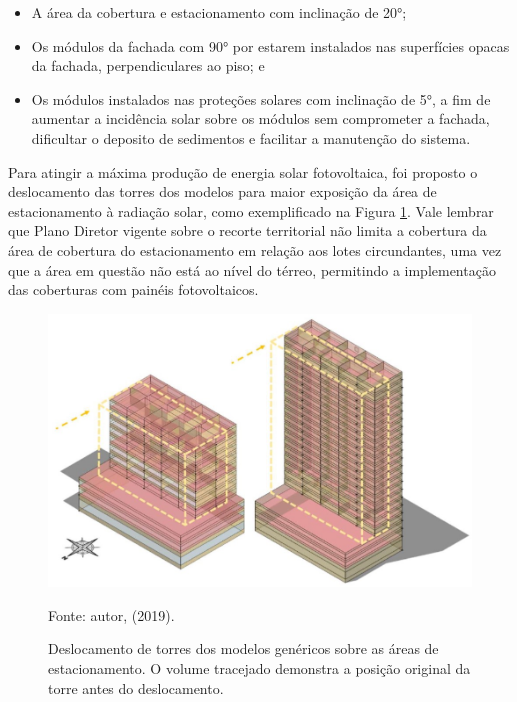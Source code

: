     \begin{itemize}
        \item A área da cobertura e estacionamento com inclinação de 20°;
        \item Os módulos da fachada com 90° por estarem instalados nas superfícies opacas da fachada, perpendiculares ao piso; e
        \item Os módulos instalados nas proteções solares com inclinação de 5°, a fim de aumentar a incidência solar sobre os módulos sem comprometer a fachada, dificultar o deposito de sedimentos e facilitar a manutenção do sistema.
    \end{itemize}
    \noindent Para atingir a máxima produção de energia solar fotovoltaica, foi proposto o deslocamento das torres dos modelos para maior exposição da área de estacionamento à radiação solar, como exemplificado na Figura \ref{fig:figure22}. Vale lembrar que Plano Diretor vigente sobre o recorte territorial não limita a cobertura da área de cobertura do estacionamento em relação aos lotes circundantes, uma vez que a área em questão não está ao nível do térreo, permitindo a implementação das coberturas com painéis fotovoltaicos.\vspace*{-0.2cm}
    \begin{figure}[H]
        \caption{Deslocamento de torres dos modelos genéricos sobre as áreas de estacionamento. O volume tracejado demonstra a posição original da torre antes do deslocamento.}
        \includegraphics[width=1.0\textwidth]{figures/fig22-modelos.jpg}
        \begin{flushleft}
            \par \small Fonte: autor, (2019).
        \end{flushleft}
        \label{fig:figure22}
    \end{figure}